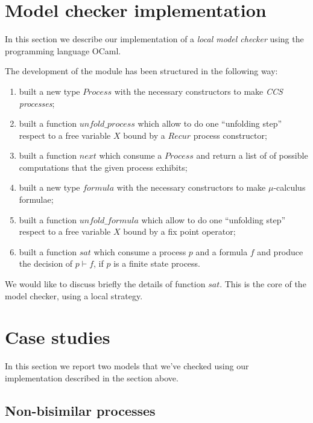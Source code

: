 \section{Model checker implementation}

In this section we describe our implementation of a \emph{local model
  checker} using the programming language OCaml.

The development of the module has been structured in the following
way:
\begin{enumerate}
\item built a new type $Process$ with the necessary constructors to
  make \emph{CCS processes};
\item built a function $unfold\_process$ which allow to do one
  ``unfolding step'' respect to a free variable $X$ bound by a $Recur$
  process constructor;
\item built a function $next$ which consume a $Process$ and return a
  list of of possible computations that the given process exhibits;
\item built a new type $formula$ with the necessary constructors to
  make $\mu$-calculus formulae;
\item built a function $unfold\_formula$ which allow to do one
  ``unfolding step'' respect to a free variable $X$ bound by a fix
  point operator;
\item built a function $sat$ which consume a process $p$ and a formula
  $f$ and produce the decision of $p \vdash f$, if $p$ is a finite
  state process.
\end{enumerate}

We would like to discuss briefly the details of function $sat$. This
is the core of the model checker, using a local strategy.

\section{Case studies}

In this section we report two models that we've checked using our
implementation described in the section above.

\subsection{Non-bisimilar processes}

